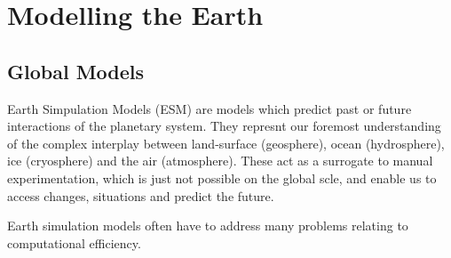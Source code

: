 \section{Modelling the Earth}

\subsection{Global Models}

 Earth Simpulation Models (ESM) are models which predict past or future interactions of the planetary system. They represnt our foremost understanding of the complex interplay between land-surface (geosphere), ocean (hydrosphere), ice (cryosphere) and the air (atmosphere). These act as a surrogate to manual experimentation, which is just not possible on the global scle, and enable us to access changes, situations and predict the future. 

Earth simulation models often have to address many problems relating to computational efficiency. 

% 
% 
% 
% 
% 
% 
% 
% 
% 
% 
% 
% 
% 


